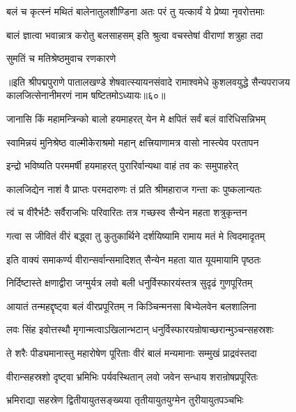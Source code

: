 \twolineshloka
{बलं च कृत्स्नं मथितं बालेनातुलशौण्डिना}
{अतः परं तु यत्कार्यं ये प्रेष्या नृवरोत्तमाः}%

\twolineshloka
{बालं ज्ञात्वा भवान्नात्र करोतु बलसाहसम्}
{इति श्रुत्वा वचस्तेषां वीराणां शत्रुहा तदा}%

\onelineshloka
{सुमतिं च मतिश्रेष्ठमुवाच रणकारणे}%

{॥इति श्रीपद्मपुराणे पातालखण्डे शेषवात्स्यायनसंवादे रामाश्वमेधे कुशलवयुद्धे सैन्यपराजय कालजित्सेनानीमरणं नाम षष्टितमोऽध्यायः॥६०॥}



\twolineshloka
{जानासि किं महामन्त्रिन्को बालो हयमाहरत्}
{येन मे क्षपितं सर्वं बलं वारिधिसन्निभम्}%


\twolineshloka
{स्वामिन्नयं मुनिश्रेष्ठ वाल्मीकेराश्रमो महान्}
{क्षत्त्रियाणामत्र वासो नास्त्येव परतापन}%

\twolineshloka
{इन्द्रो भविष्यति परममर्षी हयमाहरत्}
{पुरारिर्वान्यथा वाहं तव कः समुपाहरेत्}%

\twolineshloka
{कालजिद्येन नाशं वै प्राप्तः परमदारुणः}
{तं प्रति श्रीमहाराज गन्ता कः पुष्कलान्यतः}%

\twolineshloka
{त्वं च वीरैर्भटैः सर्वैराजभिः परिवारितः}
{तत्र गच्छस्व सैन्येन महता शत्रुकृन्तन}%

\twolineshloka
{गत्वा स जीवितं वीरं बद्ध्वा तु कुतुकार्थिने}
{दर्शयिष्यामि रामाय मतं मे त्विदमादृतम्}%

\twolineshloka
{इति वाक्यं समाकर्ण्य वीरान्सर्वान्समादिशत्}
{सैन्येन महता यात यूयमायामि पृष्ठतः}%

\twolineshloka
{निर्दिष्टास्ते क्षणाद्वीरा जग्मुर्यत्र लवो बली}
{धनुर्विस्फारयंस्तत्र सुदृढं गुणपूरितम्}%

\twolineshloka
{आयातं तन्महद्दृष्ट्वा बलं वीरप्रपूरितम्}
{न किञ्चिन्मनसा बिभ्येलवेन बलशालिना}%

\twolineshloka
{लवः सिंह इवोत्तस्थौ मृगान्मत्वाऽखिलान्भटान्}
{धनुर्विस्फारयन्रोषाच्छरान्मुञ्चन्सहस्रशः}%

\twolineshloka
{ते शरैः पीड्यमानास्तु महारोषेण पूरिताः}
{वीरं बालं मन्यमानाः सम्मुखं प्राद्रवंस्तदा}%

\twolineshloka
{वीरान्सहस्रशो दृष्ट्वा भ्रमिभिः पर्यवस्थितान्}
{लवो जवेन सन्धाय शरान्रोषप्रपूरितः}%

\twolineshloka
{भ्रमिराद्या सहस्रेण द्वितीयायुतसङ्ख्यया}
{तृतीयायुतयुग्मेन तुरीयायुतपञ्चभिः}%

